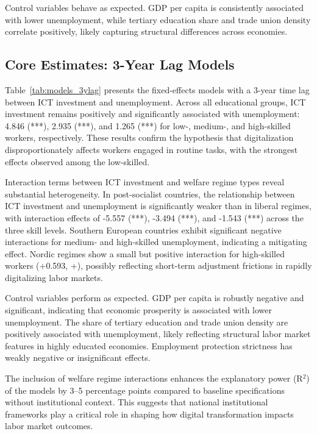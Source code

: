 Control variables behave as expected. GDP per capita is consistently associated with lower 
unemployment, while tertiary education share and trade union density correlate positively, likely 
capturing structural differences across economies.

\subsection{Core Estimates: 3-Year Lag Models}



Table~\ref{tab:models_3ylag} presents the fixed-effects models with a 3-year time lag between 
ICT investment and unemployment. Across all educational groups, ICT investment remains positively 
and significantly associated with unemployment: 4.846 (***), 2.935 (***), and 1.265 (***) for low-, 
medium-, and high-skilled workers, respectively. These results confirm the hypothesis that 
digitalization disproportionately affects workers engaged in routine tasks, with the strongest 
effects observed among the low-skilled.

Interaction terms between ICT investment and welfare regime types reveal substantial heterogeneity. 
In post-socialist countries, the relationship between ICT investment and unemployment is 
significantly weaker than in liberal regimes, with interaction effects of -5.557 (***), -3.494 (***), 
and -1.543 (***) across the three skill levels. Southern European countries exhibit significant 
negative interactions for medium- and high-skilled unemployment, indicating a mitigating effect. 
Nordic regimes show a small but positive interaction for high-skilled workers (+0.593, +), possibly 
reflecting short-term adjustment frictions in rapidly digitalizing labor markets.

Control variables perform as expected. GDP per capita is robustly negative and significant, 
indicating that economic prosperity is associated with lower unemployment. The share of tertiary 
education and trade union density are positively associated with unemployment, likely reflecting 
structural labor market features in highly educated economies. Employment protection strictness has 
weakly negative or insignificant effects.

The inclusion of welfare regime interactions enhances the explanatory power (R$^2$) of the models by 
3–5 percentage points compared to baseline specifications without institutional context. This 
suggests that national institutional frameworks play a critical role in shaping how digital 
transformation impacts labor market outcomes.

